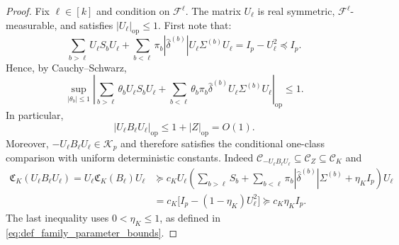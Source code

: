 \documentclass[EJP, preprint, NODS, nobera, nofontexpansion]{ejpecp}
\DeclareMathOperator{\op}{op}
\begin{document}
\begin{proof}
Fix $\ell\in[k]$ and condition on $\mathcal F^{\ell}$. 
The matrix $U_{\ell}$ is real symmetric, $\mathcal F^{\ell}$-measurable, and
satisfies $|U_{\ell}|_{\op}\leq1$. First note that:
\[
    \sum _{b>\ell}U_{\ell}S_bU_{\ell} +\sum_{b<\ell}
    \pi_b|\widehat\delta^{(b)}|U_{\ell}\Sigma^{(b)}U_{\ell}
    =I_p-U_{\ell}^2\preceq I_p.
\]
Hence, by Cauchy--Schwarz,
\begin{equation}
\label{eq:class_background_phase_bound}
    \sup_{|\theta_b|\leq1}
    \left|
        \sum_{b>\ell}\theta_bU_{\ell}S_bU_{\ell}
        +\sum_{b<\ell}\theta_b\pi_b\widehat\delta^{(b)}
            U_{\ell}\Sigma^{(b)}U_{\ell}
    \right|_{\op}
    \leq1.
\end{equation}
In particular,
\[
    |U_{\ell}B_{\ell}U_{\ell}|_{\op}\leq1+|Z|_{\op}=O(1).
\]
Moreover, $-U_{\ell}B_{\ell}U_{\ell}\in\mathcal K_p$ and therefore satisfies the conditional one-class comparison with uniform deterministic constants. Indeed $\mathcal C_{-U_{\ell}B_{\ell}U_{\ell}}
    \subseteq\mathcal C_Z\subseteq\mathcal C_K$ and
\begin{align}
    \label{eq:use_of_eta_leq_1}
    \mathfrak C_K(U_{\ell}B_{\ell}U_{\ell})
    =U_{\ell}\mathfrak C_K(B_{\ell})U_{\ell}
    &\succeq c_KU_{\ell}\left(
        \sum_{b>\ell}S_b
        +\sum_{b<\ell}\pi_b|\widehat\delta^{(b)}|\Sigma^{(b)}
        +\eta_KI_p
      \right)U_{\ell} \nonumber\\
    &=c_K\bigl[I_p-(1-\eta_K)U_{\ell}^2\bigr]
      \succeq c_K\eta_KI_p.
\end{align}
The last inequality uses $0<\eta_K\leq1$, as defined in
\eqref{eq:def_family_parameter_bounds}.


\end{proof}
\end{document}
